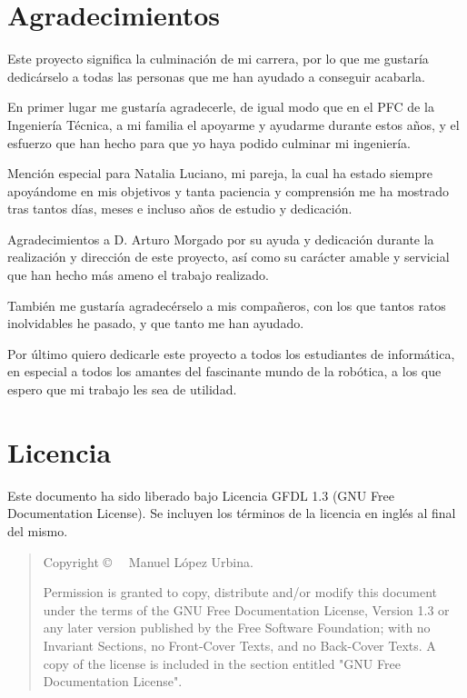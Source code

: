 

\section{Agradecimientos}
\label{sec:agradecimientos}

Este proyecto significa la culminación de mi carrera, por lo que me gustaría dedicárselo a todas las personas que me han ayudado a conseguir acabarla.\bigskip

En primer lugar me gustaría agradecerle, de igual modo que en el PFC de la Ingeniería Técnica, a mi familia el apoyarme y ayudarme durante estos años,
y el esfuerzo que han hecho para que yo haya podido culminar mi ingeniería.\bigskip

Mención especial para Natalia Luciano, mi pareja, la cual ha estado siempre apoyándome en mis objetivos y tanta paciencia y comprensión me ha mostrado tras tantos días, meses e incluso años de estudio 
y dedicación.\bigskip

Agradecimientos a D. Arturo Morgado por su ayuda y dedicación durante la realización y dirección de este proyecto, así como su carácter amable y servicial que han hecho más ameno el trabajo realizado.\bigskip

También me gustaría agradecérselo a mis compañeros, con los que tantos ratos inolvidables he pasado, y que tanto me han ayudado.\bigskip

Por último quiero dedicarle este proyecto a todos los estudiantes de informática, en especial a todos los amantes del fascinante mundo de la robótica, a los que espero que mi trabajo les sea de utilidad.

\cleardoublepage

\section{Licencia}
\label{sec:licencia}

\bigskip
\bigskip

Este documento ha sido liberado bajo Licencia GFDL 1.3 (GNU Free Documentation License). Se incluyen los términos de la licencia en inglés al final del mismo.\bigskip

\begin{quote}
Copyright \copyright~\the\year~ Manuel López Urbina.\bigskip

Permission is granted to copy, distribute and/or modify this document under the terms of the GNU Free Documentation License, Version 1.3 or  any later version published by the Free Software Foundation; with no Invariant Sections, no Front-Cover Texts, and no Back-Cover Texts. A copy of the license is included
in the section entitled "GNU Free Documentation License".
\end{quote}


\cleardoublepage

